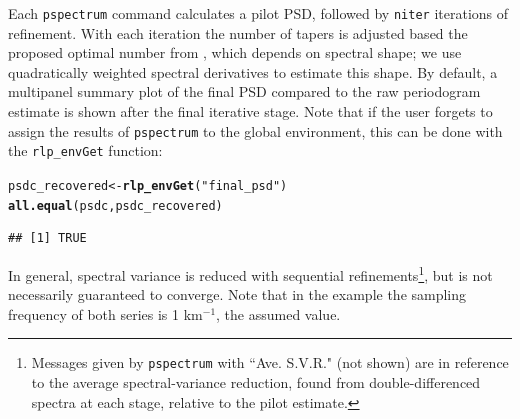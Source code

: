 \documentclass{article}\usepackage{graphicx, color}
\makeatletter
\newcommand{\hlfunctioncall}[1]{\textcolor[rgb]{0.501960784313725,0,0.329411764705882}{\textbf{#1}}}%
\newcommand{\hlstring}[1]{\textcolor[rgb]{0.6,0.6,1}{#1}}%
\newenvironment{kframe}{%
 \def\at@end@of@kframe{}%
 \ifinner\ifhmode%
  \def\at@end@of@kframe{\end{minipage}}%
  \begin{minipage}{\columnwidth}%
 \fi\fi%
 \def\FrameCommand##1{\hskip\@totalleftmargin \hskip-\fboxsep
 \colorbox{shadecolor}{##1}\hskip-\fboxsep
     \hskip-\linewidth \hskip-\@totalleftmargin \hskip\columnwidth}%
 \MakeFramed {\advance\hsize-\width
   \@totalleftmargin\z@ \linewidth\hsize
   \@setminipage}}%
 {\par\unskip\endMakeFramed%
 \at@end@of@kframe}
\newenvironment{knitrout}{}{} %
\newcommand{\Rcmd}[1]{\texttt{#1}}
\makeatother
\begin{document}
Each  \Rcmd{pspectrum} command calculates a pilot PSD, followed by 
\Rcmd{niter}
iterations of refinement.
With each iteration
the number of tapers is adjusted 
based the proposed optimal number from \citet{rs1995}, which
depends on spectral shape; we use 
quadratically weighted spectral derivatives to estimate this shape.
By default, a multipanel summary plot of the final PSD compared
to the raw periodogram estimate is shown after the final iterative stage.
Note that if the user forgets to assign the results of
\Rcmd{pspectrum} to the global environment, this can be
done with the \Rcmd{rlp\_envGet} function:
\begin{knitrout}
\color{fgcolor}\begin{kframe}
\begin{alltt}
psdc_recovered <- \hlfunctioncall{rlp_envGet}(\hlstring{"final_psd"})
\hlfunctioncall{all.equal}(psdc, psdc_recovered)
\end{alltt}
\begin{verbatim}
## [1] TRUE
\end{verbatim}
\end{kframe}
\end{knitrout}


In general, spectral variance is reduced
with sequential refinements\footnote{
Messages given by \Rcmd{pspectrum} with
``Ave. S.V.R."  (not shown)
are in reference to the 
 average spectral-variance reduction, found from
 double-differenced spectra at each stage, relative
 to the pilot estimate.
}, but is not necessarily guaranteed to converge.
Note that in the example
the sampling frequency of both series
is 1 km$^{-1}$, the assumed value.
\end{document}
